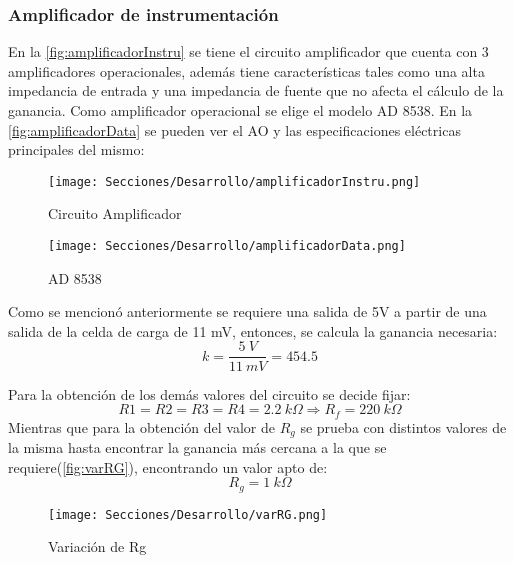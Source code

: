 \subsubsection{Amplificador de instrumentación}
En la \autoref{fig:amplificadorInstru} se tiene el circuito amplificador que cuenta con 3 amplificadores operacionales, además tiene características tales como una alta impedancia de entrada y una impedancia de fuente que no afecta el cálculo de la ganancia. Como amplificador operacional se elige el modelo AD 8538.
En la \autoref{fig:amplificadorData} se pueden ver el AO y las especificaciones eléctricas principales
del mismo:
\begin{figure}[H]
    \centering
    \texttt{[image: Secciones/Desarrollo/amplificadorInstru.png]}
    \caption{Circuito Amplificador}
    \label{fig:amplificadorInstru}
\end{figure}
\begin{figure}[H]
    \centering
    \texttt{[image: Secciones/Desarrollo/amplificadorData.png]}
    \caption{AD 8538}
    \label{fig:amplificadorData}
\end{figure}
Como se mencionó anteriormente se requiere una salida de 5V a partir de una salida de la
celda de carga de 11 mV, entonces, se calcula la ganancia necesaria:
\begin{equation*}
    k = \frac{5 ~V}{11 ~mV} = 454.5
\end{equation*}

Para la obtención de los demás valores del circuito se decide fijar:
\begin{equation*}
    R1 = R2 = R3 = R4 = 2.2~k\Omega \Rightarrow R_f = 220~k\Omega
\end{equation*}
Mientras que para la obtención del valor de $R_g$ se prueba con distintos valores de la misma hasta encontrar la ganancia más cercana a la que se requiere(\autoref{fig:varRG}), encontrando un valor apto de:
\begin{equation*}
    R_g = 1 ~k\Omega
\end{equation*}
\begin{figure}[H]
    \centering
    \texttt{[image: Secciones/Desarrollo/varRG.png]}
    \caption{Variación de Rg}
    \label{fig:varRG}
\end{figure}

